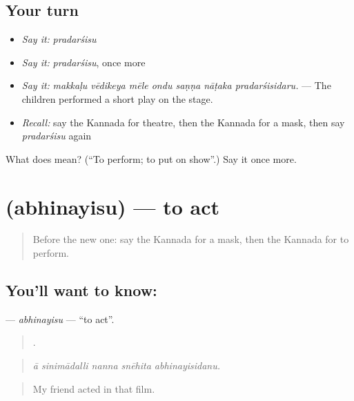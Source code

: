 \subsection*{Your turn}
\begin{itemize}
\raggedright
  \item \emph{Say it:} \emph{pradarśisu}
  \item \emph{Say it:} \emph{pradarśisu}, once more
  \item \emph{Say it:} \emph{makkaḷu vēdikeya mēle ondu saṇṇa nāṭaka pradarśisidaru.} — The children performed a short play on the stage.
  \item \emph{Recall:} say the Kannada for theatre, then the Kannada for a mask, then say \emph{pradarśisu} again
\end{itemize}

\begin{tcolorbox}[breakable,colback=teal!4,colframe=teal!35!black,title={Before you move on}]
What does  mean? (\textquotedblleft{}To perform; to put on show\textquotedblright{}.) Say it once more.
\end{tcolorbox}
\section[\texorpdfstring{\kn{ಅಭಿನಯಿಸು} (abhinayisu)}{ಅಭಿನಯಿಸು (abhinayisu)}]{ (abhinayisu) — to act}

\label{lesson:KA-C536-abhinayisu}



\begin{quote}
Before the new one: say the Kannada for a mask, then the Kannada for to perform.
\end{quote}

\subsection*{You'll want to know: }
\textbf{} — \emph{abhinayisu} — \textquotedblleft{}to act\textquotedblright{}.

\begin{quote}
    .
\end{quote}

\begin{quote}
\emph{ā sinimādalli nanna snēhita abhinayisidanu.}
\end{quote}

\begin{quote}
My friend acted in that film.
\end{quote}

